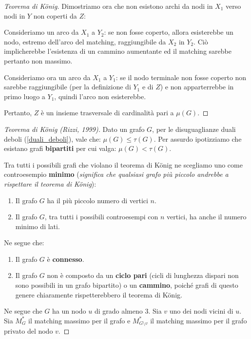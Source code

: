 \documentclass[\main/main.tex]{subfiles}
\begin{document}
\begin{proof}[Teorema di König]
	Dimostriamo ora che non esistono archi da nodi in \(X_1\) verso nodi in \(Y\) non coperti da \(Z\):

	Consideriamo un arco da \(X_1\) a \(Y_2\): se non fosse coperto, allora esisterebbe un nodo, estremo dell'arco del matching, raggiungibile da \(X_2\) in \(Y_2\). Ciò implicherebbe l'esistenza di un cammino aumentante ed il matching sarebbe pertanto non massimo.

	Consideriamo ora un arco da \(X_1\) a \(Y_1\): se il nodo terminale non fosse coperto non sarebbe raggiungibile (per la definizione di \(Y_1\) e di \(Z\)) e non apparterrebbe in primo luogo a \(Y_1\), quindi l'arco non esisterebbe.

	Pertanto, \(Z\) è un insieme trasversale di cardinalità pari a \(\mu(G)\).
\end{proof}
\clearpage
\begin{proof}[Teorema di König (Rizzi, 1999)]
	Dato un grafo \(G\), per le disuguaglianze duali deboli (\ref{duali_deboli}), vale che: \(\mu(G) \leq \tau(G)\). Per assurdo ipotizziamo che esistano grafi \textbf{bipartiti} per cui valga: \(\mu(G) < \tau(G)\).

	Tra tutti i possibili grafi che violano il teorema di König ne scegliamo uno come controesempio \textbf{minimo} (\textit{significa che qualsiasi grafo più piccolo andrebbe a rispettare il teorema di König}):
	\begin{enumerate}
		\item Il grafo \(G\) ha il più piccolo numero di vertici \(n\).
		\item Il grafo \(G\), tra tutti i possibili controesempi con \(n\) vertici, ha anche il numero minimo di lati.
	\end{enumerate}

	Ne segue che:

	\begin{enumerate}
		\item Il grafo \(G\) è \textbf{connesso}.
		\item Il grafo \(G\) non è composto da un \textbf{ciclo pari} (cicli di lunghezza dispari non sono possibili in un grafo bipartito) o un \textbf{cammino}, poiché grafi di questo genere chiaramente rispetterebbero il teorema di König.
	\end{enumerate}

	Ne segue che \(G\) ha un nodo \(u\) di grado almeno \(3\). Sia \(v\) uno dei nodi vicini di \(u\). Sia \(M^*_G\) il matching massimo per il grafo e \(M^*_{G\setminus v}\) il matching massimo per il grafo privato del nodo \(v\).


\end{proof}
\end{document}
